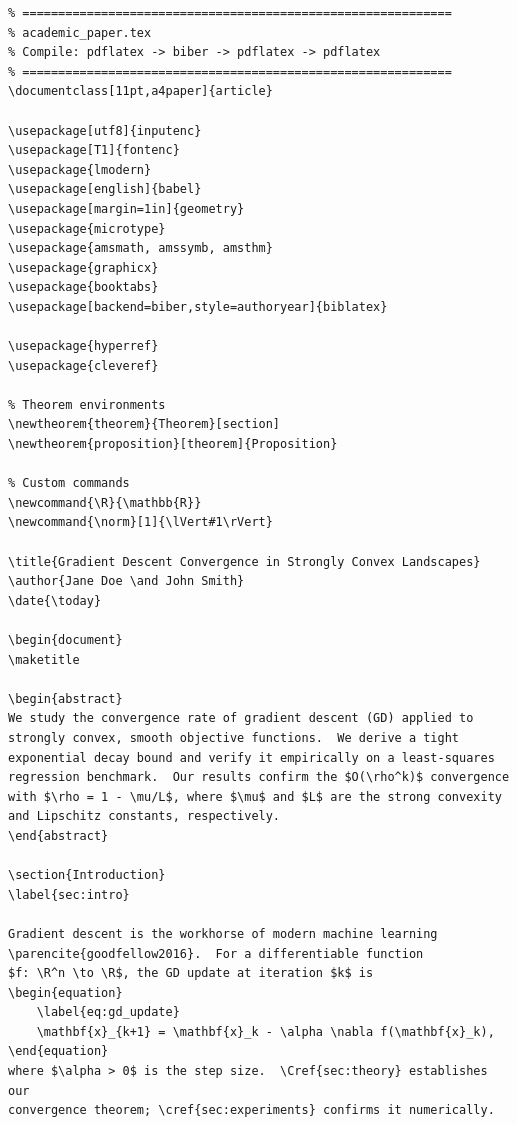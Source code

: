 \documentclass[12pt, a4paper]{article}
\begin{document}
\begin{verbatim}
% ============================================================
% academic_paper.tex
% Compile: pdflatex -> biber -> pdflatex -> pdflatex
% ============================================================
\documentclass[11pt,a4paper]{article}

\usepackage[utf8]{inputenc}
\usepackage[T1]{fontenc}
\usepackage{lmodern}
\usepackage[english]{babel}
\usepackage[margin=1in]{geometry}
\usepackage{microtype}
\usepackage{amsmath, amssymb, amsthm}
\usepackage{graphicx}
\usepackage{booktabs}
\usepackage[backend=biber,style=authoryear]{biblatex}

\usepackage{hyperref}
\usepackage{cleveref}

% Theorem environments
\newtheorem{theorem}{Theorem}[section]
\newtheorem{proposition}[theorem]{Proposition}

% Custom commands
\newcommand{\R}{\mathbb{R}}
\newcommand{\norm}[1]{\lVert#1\rVert}

\title{Gradient Descent Convergence in Strongly Convex Landscapes}
\author{Jane Doe \and John Smith}
\date{\today}

\begin{document}
\maketitle

\begin{abstract}
We study the convergence rate of gradient descent (GD) applied to
strongly convex, smooth objective functions.  We derive a tight
exponential decay bound and verify it empirically on a least-squares
regression benchmark.  Our results confirm the $O(\rho^k)$ convergence
with $\rho = 1 - \mu/L$, where $\mu$ and $L$ are the strong convexity
and Lipschitz constants, respectively.
\end{abstract}

\section{Introduction}
\label{sec:intro}

Gradient descent is the workhorse of modern machine learning
\parencite{goodfellow2016}.  For a differentiable function
$f: \R^n \to \R$, the GD update at iteration $k$ is
\begin{equation}
    \label{eq:gd_update}
    \mathbf{x}_{k+1} = \mathbf{x}_k - \alpha \nabla f(\mathbf{x}_k),
\end{equation}
where $\alpha > 0$ is the step size.  \Cref{sec:theory} establishes our
convergence theorem; \cref{sec:experiments} confirms it numerically.


\end{verbatim}
\end{document}
